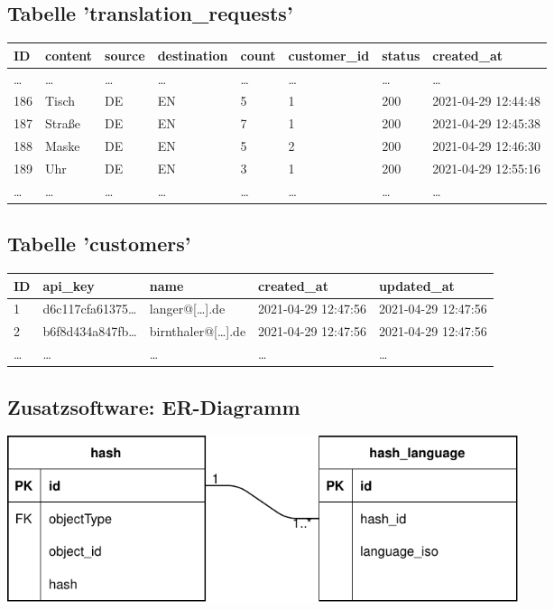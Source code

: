 \subsection{Tabelle 'translation\_requests'}
\label{sec:table_tranlation_request}
\begin{center}
\begin{tabular}{ |l|l|l|l|l|l|l|l| }
    \hline
    ID & content & source & destination & count & customer\_id  & status & created\_at\\ 
    \hline
    \dots & \dots & \dots & \dots & \dots & \dots & \dots & \dots\\  
    186 & Tisch & DE & EN & 5 & 1 & 200 & 2021-04-29 12:44:48 \\  
    187 & Straße & DE & EN & 7 & 1 & 200 & 2021-04-29 12:45:38 \\  
    188 & Maske & DE & EN & 5 & 2 & 200 & 2021-04-29 12:46:30 \\  
    189 & Uhr & DE & EN & 3 & 1 & 200 & 2021-04-29 12:55:16 \\  
    \dots & \dots & \dots & \dots & \dots & \dots & \dots & \dots\\  
    \hline
\end{tabular}
\end{center}

\subsection{Tabelle 'customers'}
\label{sec:table_customers}

\begin{center}
\begin{tabular}{ |l|l|l|l|l| }
    \hline
    ID & api\_key & name & created\_at & updated\_at \\ 
    \hline
    1 & d6c117cfa61375\dots & langer@[\dots].de & 2021-04-29 12:47:56 & 2021-04-29 12:47:56\\  
    2 & b6f8d434a847fb\dots & birnthaler@[\dots].de & 2021-04-29 12:47:56 & 2021-04-29 12:47:56\\  
    \dots & \dots & \dots & \dots & \dots\\  
    \hline
\end{tabular}
\end{center}

\subsection{Zusatzsoftware: ER-Diagramm}
\label{sec:erd-csharp}
\includegraphics[width=15cm]{./img/ERD-Cscharp.pdf}



